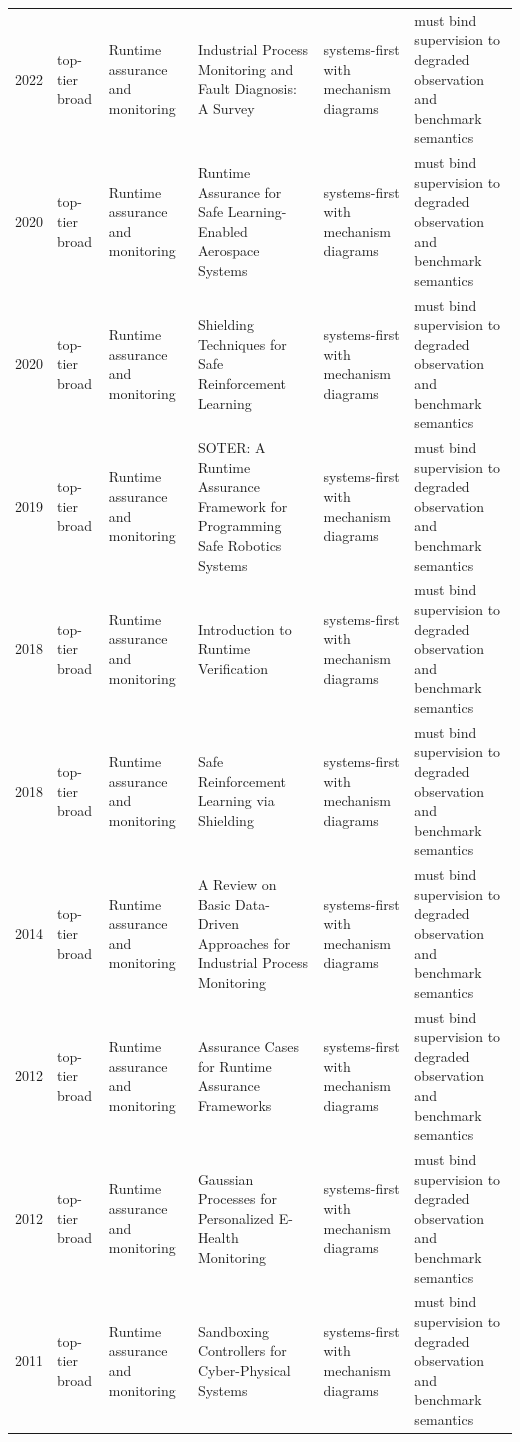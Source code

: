 \begin{longtable}{p{}p{}p{}p{}p{}p{}}
2022 & top-tier broad & Runtime assurance and monitoring & Industrial Process Monitoring and Fault Diagnosis: A Survey & systems-first with mechanism diagrams & must bind supervision to degraded observation and benchmark semantics\\
2020 & top-tier broad & Runtime assurance and monitoring & Runtime Assurance for Safe Learning-Enabled Aerospace Systems & systems-first with mechanism diagrams & must bind supervision to degraded observation and benchmark semantics\\
2020 & top-tier broad & Runtime assurance and monitoring & Shielding Techniques for Safe Reinforcement Learning & systems-first with mechanism diagrams & must bind supervision to degraded observation and benchmark semantics\\
2019 & top-tier broad & Runtime assurance and monitoring & SOTER: A Runtime Assurance Framework for Programming Safe Robotics Systems & systems-first with mechanism diagrams & must bind supervision to degraded observation and benchmark semantics\\
2018 & top-tier broad & Runtime assurance and monitoring & Introduction to Runtime Verification & systems-first with mechanism diagrams & must bind supervision to degraded observation and benchmark semantics\\
2018 & top-tier broad & Runtime assurance and monitoring & Safe Reinforcement Learning via Shielding & systems-first with mechanism diagrams & must bind supervision to degraded observation and benchmark semantics\\
2014 & top-tier broad & Runtime assurance and monitoring & A Review on Basic Data-Driven Approaches for Industrial Process Monitoring & systems-first with mechanism diagrams & must bind supervision to degraded observation and benchmark semantics\\
2012 & top-tier broad & Runtime assurance and monitoring & Assurance Cases for Runtime Assurance Frameworks & systems-first with mechanism diagrams & must bind supervision to degraded observation and benchmark semantics\\
2012 & top-tier broad & Runtime assurance and monitoring & Gaussian Processes for Personalized E-Health Monitoring & systems-first with mechanism diagrams & must bind supervision to degraded observation and benchmark semantics\\
2011 & top-tier broad & Runtime assurance and monitoring & Sandboxing Controllers for Cyber-Physical Systems & systems-first with mechanism diagrams & must bind supervision to degraded observation and benchmark semantics\\

\end{longtable}
